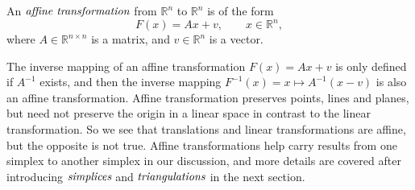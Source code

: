      \begin{definition}
      An $\emph{affine transformation}$ from $\mathbb{R}^n$ to $\mathbb{R}^n$ is of the form
      \begin{equation*}
      {F}(x) = {Ax} + {v}, \qquad {x}\in\mathbb{R}^n,
      \end{equation*}
      where ${A}\in\mathbb{R}^{n\times n}$ is a matrix, and  ${v}\in\mathbb{R}^n$ is a vector.
      \end{definition}
      The inverse mapping of an affine transformation $F(x) = Ax + v$ is only defined if $A^{-1}$ exists, and then the inverse mapping $F^{-1}(x) = {x} \mapsto {A}^{-1}({x} - {v})$ is also an affine transformation.
      Affine transformation preserves points, lines and planes, but need not preserve the origin in a linear space in contrast to the linear transformation. So we see that translations and linear transformations are affine, but the opposite is not true. Affine transformations help carry results from one simplex to another simplex in our discussion, and more details are covered after introducing $\emph{simplices}$ and $\emph{triangulations}$ in the next section.


